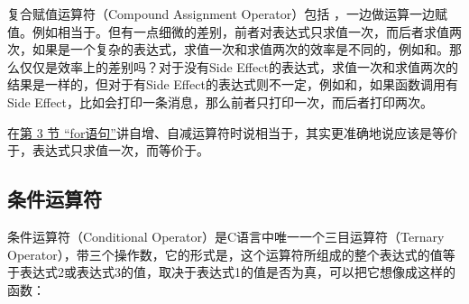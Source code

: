 复合赋值运算符（Compound Assignment Operator）包括\BookCode{*=\BookSplit{}} \BookCode{/\BookSplit{}=\BookSplit{}} \BookCode{\%=\BookSplit{}} \BookCode{+\BookSplit{}=\BookSplit{}} \BookCode{-\BookSplit{}=\BookSplit{}} \BookCode{\textless{}\textless{}=\BookSplit{}} \BookCode{\textgreater{}\textgreater{}=\BookSplit{}} \BookCode{\&=\BookSplit{}} \BookCode{\textasciicircum{}=\BookSplit{}} \BookCode{|\BookSplit{}=\BookSplit{}}，一边做运算一边赋值。例如相当于。但有一点细微的差别，前者对表达式只求值一次，而后者求值两次，如果是一个复杂的表达式，求值一次和求值两次的效率是不同的，例如和。那么仅仅是效率上的差别吗？对于没有Side Effect的表达式，求值一次和求值两次的结果是一样的，但对于有Side Effect的表达式则不一定，例如和，如果函数调用有Side Effect，比如会打印一条消息，那么前者只打印一次，而后者打印两次。



在\hyperlink{db.ch06s03.id2726720}{第 3 节 “for语句”}讲自增、自减运算符时说相当于，其实更准确地说应该是等价于，表达式只求值一次，而等价于。


\subsection{条件运算符}
%


条件运算符（Conditional Operator）是C语言中唯一一个三目运算符（Ternary Operator），带三个操作数，它的形式是，这个运算符所组成的整个表达式的值等于表达式2或表达式3的值，取决于表达式1的值是否为真，可以把它想像成这样的函数：




